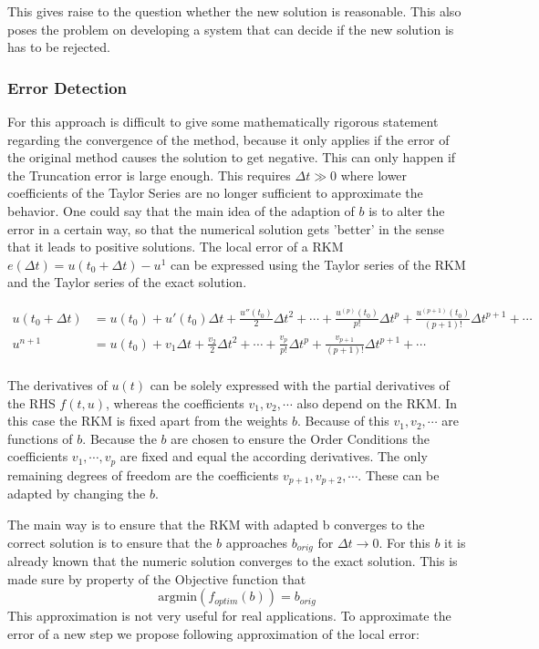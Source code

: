 \documentclass{article}
\begin{document}
This gives raise to the question whether the new solution is reasonable.
This also poses the problem on developing a system that can decide if the new solution is has to be rejected. 
 
\subsubsection{Error Detection}
For this approach is difficult to give some mathematically rigorous statement regarding the convergence of the method, because it only applies if the error of the original method causes the solution to get negative. This can only happen if the Truncation error is large enough. This requires $\Delta t \gg 0$ where lower coefficients of the Taylor Series are no longer sufficient to approximate the behavior. 
One could say that the main idea of the adaption of $b$ is to alter the error in a certain way, so that the numerical solution gets 'better' in the sense that it leads to positive solutions. 
The local error of a RKM $e(\Delta t) =u(t_0 + \Delta t) - u^1$ can be expressed using the Taylor series of the RKM and the Taylor series of the exact solution. %

\begin{align}\label{eq:Taylor_sol_ref}
u(t_0 + \Delta t) &= u(t_0) + u'(t_0) \Delta t + \frac{u''(t_0)}{2} \Delta t^2 + \cdots + \frac{u^{(p)}(t_0)}{p!} \Delta t^p + \frac{u^{(p+1)}(t_0)}{(p+1)!} \Delta t^{p+1} + \cdots \\
u^{n+1} &= u(t_0)  + v_1 \Delta t + \frac{v_2}{2} \Delta t^2 + \cdots + \frac{v_p}{p!} \Delta t^p + \frac{v_{p+1}}{(p+1)!} \Delta t^{p+1} + \cdots \\
\end{align}

The derivatives of $u(t)$ can be solely expressed with the partial derivatives of the RHS $f(t,u)$, whereas the coefficients $v_1,v_2,\cdots$ also depend on the RKM. 
In this case the RKM is fixed apart from the weights $b$. 
Because of this $v_1,v_2,\cdots$ are functions of $b$.
Because the $b$ are chosen to ensure the Order Conditions the coefficients $v_1,\cdots,v_p$ are fixed and equal the according derivatives. 
The only remaining degrees of freedom are the coefficients $v_{p+1},v_{p+2},\cdots$.
These can be adapted by changing the $b$.

The main way is to ensure that the RKM with adapted b converges to the correct solution is to ensure that the $b$ approaches $b_{orig}$ for $\Delta t \to 0$. For this $b$ it is already known that the numeric solution converges to the exact solution.  
This is made sure by property of the Objective function that 
\begin{equation}
\mathrm{argmin}(f_{optim}(b)) = b_{orig}
\end{equation}
This approximation is not very useful for real applications. 
To approximate the error of a new step we propose following approximation of the local error:
\end{document}

